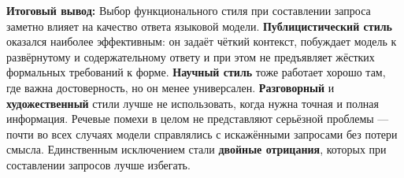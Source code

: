 \documentclass[a4paper, final]{article}
\begin{document}
\vspace{1em}
\textbf{Итоговый вывод:} Выбор функционального стиля при составлении запроса заметно влияет на качество ответа языковой модели. \textbf{Публицистический стиль} оказался наиболее эффективным: он задаёт чёткий контекст, побуждает модель к развёрнутому и содержательному ответу и при этом не предъявляет жёстких формальных требований к форме. \textbf{Научный стиль} тоже работает хорошо там, где важна достоверность, но он менее универсален. \textbf{Разговорный} и \textbf{художественный} стили лучше не использовать, когда нужна точная и полная информация. Речевые помехи в целом не представляют серьёзной проблемы — почти во всех случаях модели справлялись с искажёнными запросами без потери смысла. Единственным исключением стали \textbf{двойные отрицания}, которых при составлении запросов лучше избегать.
\end{document}
